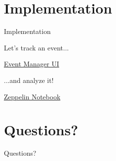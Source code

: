 \documentclass{beamer}
\newcommand{\hugeframe}[2]{
\begin{frame}[plain,c]
  \begin{center}
    \huge\textcolor{title}{#1}
    \vfill

    \normalsize #2

  \end{center}

\end{frame}}
\begin{document}
\section{Implementation}
\hugeframe{Implementation}{}


\hugeframe{Let's track an event...}{\href{http://epic.gerard.space}{Event Manager UI}}
\hugeframe{...and analyze it!}{\href{http://epic.gerard.space/zeppelin/}{Zeppelin Notebook}}



\section{Questions?}
\hugeframe{Questions?}{}




\end{document}
